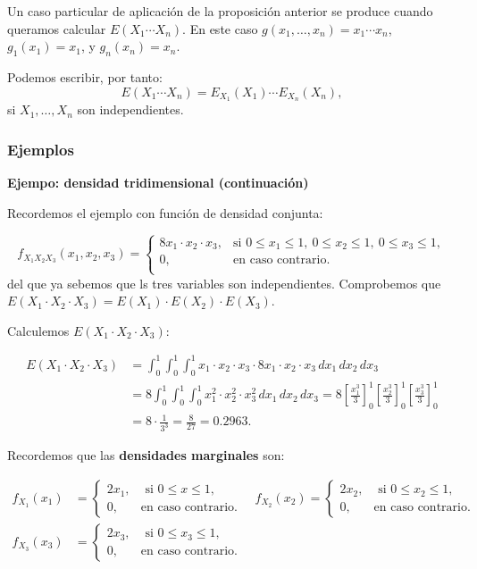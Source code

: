 \documentclass[]{book}
\begin{document}
Un caso particular de aplicación de la proposición anterior se produce cuando queramos calcular \(E(X_1\cdots X_n)\). En este caso \(g(x_1,\ldots,x_n)=x_1\cdots x_n\), \(g_1(x_1)=x_1\), y \(g_n(x_n)=x_n\).

Podemos escribir, por tanto:
\[
E(X_1\cdots X_n)=E_{X_1}(X_1)\cdots E_{X_n}(X_n),
\]
si \(X_1,\ldots,X_n\) son independientes.

\hypertarget{ejemplos-14}{%
\subsubsection{Ejemplos}\label{ejemplos-14}}

\textbf{Ejempo: densidad tridimensional (continuación)}

Recordemos el ejemplo con función de densidad conjunta:

\[
f_{X_1X_2X_3}(x_1,x_2,x_3)=\begin{cases}
8 x_1\cdot x_2\cdot x_3, & \mbox{si }0\leq x_1\leq 1,\ 0\leq x_2\leq 1,\ 0\leq x_3\leq 1, \\
0, & \mbox{en caso contrario.}\\
\end{cases}
\]
del que ya sebemos que ls tres variables son independientes.
Comprobemos que \(E(X_1\cdot X_2\cdot X_3)=E(X_1)\cdot E(X_2)\cdot E(X_3)\).

Calculemos \(E(X_1\cdot X_2\cdot X_3)\):

\[
\begin{array}{rl}
E(X_1\cdot X_2\cdot X_3)  & = \int_0^1\int_0^1\int_0^1 x_1\cdot x_2\cdot x_3\cdot 8 x_1\cdot x_2\cdot x_3\,dx_1\, dx_2\, dx_3 \\ & = 8\int_0^1\int_0^1\int_0^1 x_1^2\cdot x_2^2\cdot x_3^2\,dx_1\, dx_2\, dx_3 =8\left[\frac{x_1^3}{3}\right]_0^1\left[\frac{x_2^3}{3}\right]_0^1
\left[\frac{x_3^3}{3}\right]_0^1 \\
& = 8\cdot \frac{1}{3^3}=\frac{8}{27}=0.2963.
\end{array}
\]

Recordemos que las \textbf{densidades marginales} son:

\[
\begin{array}{rl}
f_{X_1}(x_1) & =\begin{cases}
2x_1, & \mbox{ si }0\leq x\leq 1,\\
0, & \mbox{en caso contrario.}
\end{cases}\quad f_{X_2}(x_2)=\begin{cases}
2x_2, & \mbox{ si }0\leq x_2\leq 1,\\
0, & \mbox{en caso contrario.}
\end{cases}\\ f_{X_3}(x_3) & =\begin{cases}
2x_3, & \mbox{ si }0\leq x_3\leq 1,\\
0, & \mbox{en caso contrario.}
\end{cases}
\end{array}
\]
\end{document}
